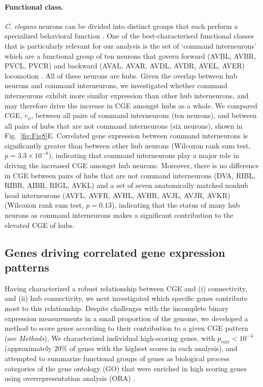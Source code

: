 \documentclass[10pt,letterpaper]{article}
\begin{document}
{\paragraph{Functional class.}
\emph{C. elegans} neurons can be divided into distinct groups that each perform a specialized behavioral function \cite{Hobert2003}.
One of the best-characterised functional classes that is particularly relevant for our analysis is the set of `command interneurons' which are a functional group of ten neurons that govern forward (AVBL, AVBR, PVCL, PVCR) and backward (AVAL, AVAR, AVDL, AVDR, AVEL, AVER) locomotion \cite{Rakowski2013}.
All of these neurons are hubs.
Given the overlap between hub neurons and command interneurons, we investigated whether command interneurons exhibit more similar expression than other hub interneurons, and may therefore drive the increase in CGE amongst hubs as a whole.
We compared CGE, $r_\phi$, between all pairs of command interneurons (ten neurons), and between all pairs of hubs that are not command interneurons (six neurons), shown in Fig.~\ref{fig:Fig8}E.
Correlated gene expression between command interneurons is significantly greater than between other hub neurons (Wilcoxon rank sum test, $p = 3.3 \times 10^{-8}$), indicating that command interneurons play a major role in driving the increased CGE amongst hub neurons.
Moreover, there is no difference in CGE between pairs of hubs that are not command interneurons (DVA, RIBL, RIBR, AIBR, RIGL, AVKL) and a set of seven anatomically matched nonhub head interneurons (AVFL, AVFR, AVHL, AVHR, AVJL, AVJR, AVKR) (Wilcoxon rank sum test, $p = 0.13$), indicating that the status of many hub neurons as command interneurons makes a significant contribution to the elevated CGE of hubs.

\subsection*{Genes driving correlated gene expression patterns}

Having characterized a robust relationship between CGE and (i) connectivity, and (ii) hub connectivity, we next investigated which specific genes contribute most to this relationship.
Despite challenges with the incomplete binary expression measurements in a small proportion of the genome, we developed a method to score genes according to their contribution to a given CGE pattern (see \emph{Methods}).
We characterized individual high-scoring genes, with $p_\mathrm{corr} < 10^{-4}$ (approximately 20\% of genes with the highest scores in each analysis), and attempted to summarize functional groups of genes as biological process categories of the gene ontology (GO) that were enriched in high scoring genes using overrepresentation analysis (ORA) \cite{Ashburner2000, Gillis2010}.

}
\end{document}

